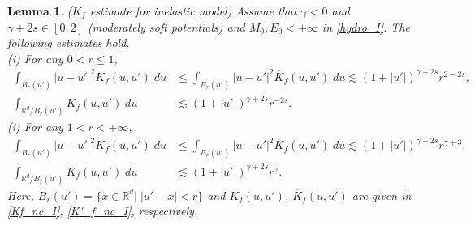 \documentclass[reqno,10pt]{amsart}
\newtheorem{lemma}[theorem]{Lemma}
\numberwithin{equation}{section}
\begin{document}
\begin{lemma} ($K_f$ estimate for inelastic model) \label{Kf_est_I}
Assume that $\gamma<0$ and $\gamma+2s \in [0,2]$ (moderately soft potentials) and $M_0, E_0 < +\infty$ in \eqref{hydro_I}.
The following estimates hold. \\
(i) For any $0<r \leq 1$,
\begin{align} 
    \int_{B_{r}(u')}|u-u'|^2K_f(u,u')\; du &\leq \int_{B_{r}(u')}|u-u'|^2\overline{K}_{f}(u,u')\; du \lesssim (1+|u'|)^{\gamma+2s}r^{2-2s}, \label{Kf_est_1_I} \\
     \int_{\mathbb{R}^d/B_{r}(u')}K_f(u,u')\; du &\lesssim (1+|u'|)^{\gamma+2s}r^{-2s}. \label{Kf_est_2_I}
\end{align}
(i) For any $1<r<+\infty$,
\begin{align}  
    \int_{B_{r}(u')}|u-u'|^2K_f(u,u')\; du &\leq \int_{B_{r}(u')}|u-u'|^2\overline{K}_{f}(u,u')\; du \lesssim (1+|u'|)^{\gamma+2s}r^{\gamma+3}, \label{Kf_est_3_I} \\
     \int_{\mathbb{R}^d/B_{r}(u')}K_f(u,u')\; du &\lesssim (1+|u'|)^{\gamma+2s}r^{\gamma}. \label{Kf_est_4_I}
\end{align}
Here, $B_r(u') =\{x\in \mathbb{R}^d | \;|u'-x|<r \}$ and $K_f(u,u')$, $\overline{K}_f(u,u')$ are given in \eqref{Kf_nc_I}, \eqref{K'_f_nc_I}, respectively.
\end{lemma}
\end{document}
